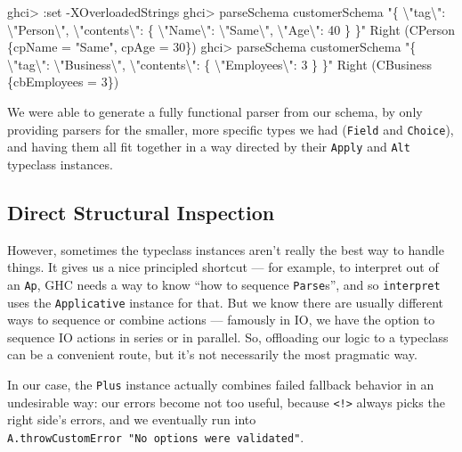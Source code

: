 \documentclass[]{article}
\newenvironment{Shaded}{}{}
\newcommand{\DataTypeTok}[1]{\textcolor[rgb]{0.56,0.13,0.00}{#1}}
\newcommand{\DecValTok}[1]{\textcolor[rgb]{0.25,0.63,0.44}{#1}}
\newcommand{\NormalTok}[1]{#1}
\newcommand{\OperatorTok}[1]{\textcolor[rgb]{0.40,0.40,0.40}{#1}}
\newcommand{\OtherTok}[1]{\textcolor[rgb]{0.00,0.44,0.13}{#1}}
\newcommand{\StringTok}[1]{\textcolor[rgb]{0.25,0.44,0.63}{#1}}
\begin{document}
\begin{Shaded}
\begin{Highlighting}[]
\NormalTok{ghci}\OperatorTok{>} \OperatorTok{:}\NormalTok{set }\OperatorTok{{-}}\DataTypeTok{XOverloadedStrings}
\NormalTok{ghci}\OperatorTok{>}\NormalTok{ parseSchema customerSchema  }\StringTok{"\{ \textbackslash{}"tag\textbackslash{}": \textbackslash{}"Person\textbackslash{}", \textbackslash{}"contents\textbackslash{}": \{ \textbackslash{}"Name\textbackslash{}": \textbackslash{}"Same\textbackslash{}", \textbackslash{}"Age\textbackslash{}": 40 \} \}"}
\DataTypeTok{Right}\NormalTok{ (}\DataTypeTok{CPerson}\NormalTok{ \{cpName }\OtherTok{=} \StringTok{"Same"}\NormalTok{, cpAge }\OtherTok{=} \DecValTok{30}\NormalTok{\})}
\NormalTok{ghci}\OperatorTok{>}\NormalTok{ parseSchema customerSchema  }\StringTok{"\{ \textbackslash{}"tag\textbackslash{}": \textbackslash{}"Business\textbackslash{}", \textbackslash{}"contents\textbackslash{}": \{ \textbackslash{}"Employees\textbackslash{}": 3 \} \}"}
\DataTypeTok{Right}\NormalTok{ (}\DataTypeTok{CBusiness}\NormalTok{ \{cbEmployees }\OtherTok{=} \DecValTok{3}\NormalTok{\})}
\end{Highlighting}
\end{Shaded}

We were able to generate a fully functional parser from our schema, by only
providing parsers for the smaller, more specific types we had (\texttt{Field}
and \texttt{Choice}), and having them all fit together in a way directed by
their \texttt{Apply} and \texttt{Alt} typeclass instances.

\hypertarget{direct-structural-inspection}{%
\subsection{Direct Structural Inspection}\label{direct-structural-inspection}}

However, sometimes the typeclass instances aren't really the best way to handle
things. It gives us a nice principled shortcut --- for example, to interpret out
of an \texttt{Ap}, GHC needs a way to know ``how to sequence \texttt{Parse}s'',
and so \texttt{interpret} uses the \texttt{Applicative} instance for that. But
we know there are usually different ways to sequence or combine actions ---
famously in IO, we have the option to sequence IO actions in series or in
parallel. So, offloading our logic to a typeclass can be a convenient route, but
it's not necessarily the most pragmatic way.

In our case, the \texttt{Plus} instance actually combines failed fallback
behavior in an undesirable way: our errors become not too useful, because
\texttt{\textless{}!\textgreater{}} always picks the right side's errors, and we
eventually run into \texttt{A.throwCustomError\ "No\ options\ were\ validated"}.
\end{document}
